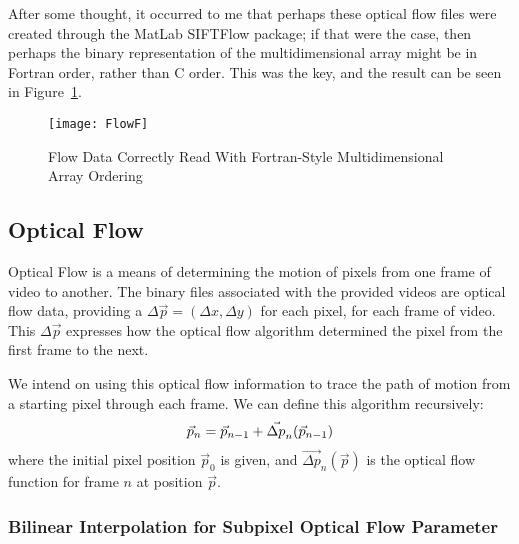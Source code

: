 \par After some thought, it occurred to me that perhaps these optical flow files were created through the MatLab SIFTFlow package; if that were the case, then perhaps the binary representation of the multidimensional array might be in Fortran order, rather than C order. This was the key, and the result can be seen in Figure~\ref{fig:flowf}.

\begin{figure}[h]
\centering
\texttt{[image: FlowF]}
\caption{Flow Data Correctly Read With Fortran-Style Multidimensional Array Ordering}
\label{fig:flowf}
\end{figure}

\subsection{Optical Flow}
Optical Flow is a means of determining the motion of pixels from one frame of video to another. The binary files associated with the provided videos are optical flow data, providing a $\Delta \vec{p} = (\Delta x, \Delta y)$ for each pixel, for each frame of video. This $\Delta \vec{p}$ expresses how the optical flow algorithm determined the pixel from the first frame to the next.
\par We intend on using this optical flow information to trace the path of motion from a starting pixel through each frame. We can define this algorithm recursively:
\begin{equation}
    \vec{p}_n = \vec{p}_{n-1} + \vec{\Delta p}_n(\vec{p}_{n-1}) \\
\end{equation}
where the initial pixel position $\vec{p}_0$ is given, and $\vec{\Delta p}_n(\vec{p})$ is the optical flow function for frame $n$ at position $\vec{p}$.

\subsubsection{Bilinear Interpolation for Subpixel Optical Flow Parameter}

